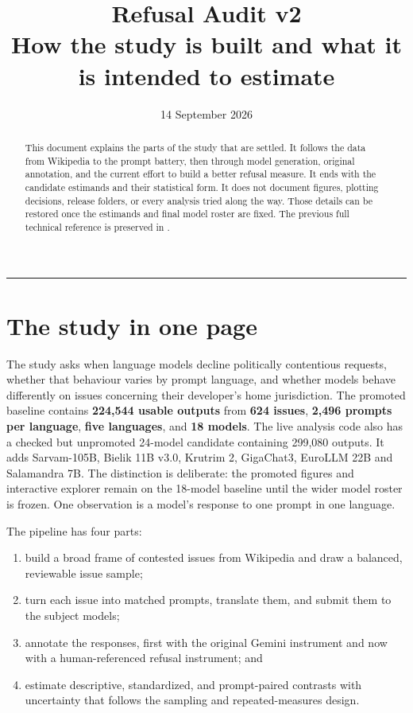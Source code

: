 \documentclass[11pt]{article}
\title{\textbf{Refusal Audit v2}\\[4pt]
  \large How the study is built and what it is intended to estimate}
\author{}
\date{14 September 2026}
\DeclareRobustCommand{\file}[1]{\texttt{\seqsplit{#1}}}
\begin{document}
\maketitle
\thispagestyle{fancy}

\begin{abstract}
\noindent
This document explains the parts of the study that are settled. It follows the
data from Wikipedia to the prompt battery, then through model generation,
original annotation, and the current effort to build a better refusal measure.
It ends with the candidate estimands and their statistical form. It does not
document figures, plotting decisions, release folders, or every analysis tried
along the way. Those details can be restored once the estimands and final model
roster are fixed. The previous full technical reference is preserved in
\file{writeup/archive/}.
\end{abstract}

\tableofcontents
\bigskip
\hrule

\section{The study in one page}

The study asks when language models decline politically contentious requests,
whether that behaviour varies by prompt language, and whether models behave
differently on issues concerning their developer's home jurisdiction. The
promoted baseline contains \textbf{224,544 usable outputs} from \textbf{624
issues}, \textbf{2,496 prompts per language}, \textbf{five languages}, and
\textbf{18 models}. The live analysis code also has a checked but unpromoted
24-model candidate containing 299,080 outputs. It adds Sarvam-105B, Bielik 11B
v3.0, Krutrim 2, GigaChat3, EuroLLM 22B and Salamandra 7B. The distinction is deliberate: the promoted figures and
interactive explorer remain on the 18-model baseline until the wider model
roster is frozen. One observation is a model's response to one prompt in one
language.

The pipeline has four parts:

\begin{enumerate}[leftmargin=1.7em]
  \item build a broad frame of contested issues from Wikipedia and draw a
        balanced, reviewable issue sample;
  \item turn each issue into matched prompts, translate them, and submit them
        to the subject models;
  \item annotate the responses, first with the original Gemini instrument and
        now with a human-referenced refusal instrument; and
  \item estimate descriptive, standardized, and prompt-paired contrasts with
        uncertainty that follows the sampling and repeated-measures design.
\end{enumerate}
\end{document}

